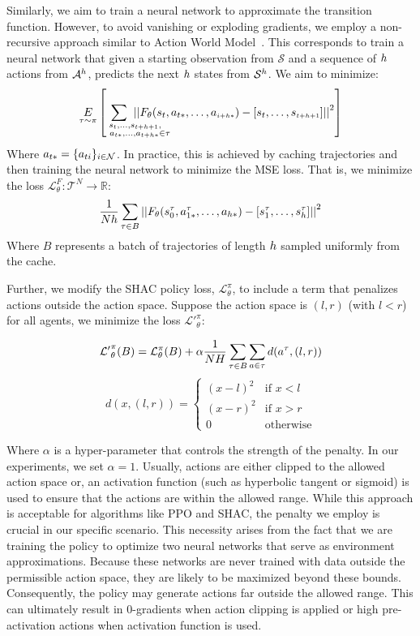 Similarly, we aim to train a neural network to approximate the transition function. However, to avoid vanishing or exploding gradients, we employ a non-recursive approach similar to Action World Model~\cite{Ma24}. This corresponds to train a neural network that given a starting observation from $\mathcal{S}$ and a sequence of $h$ actions from $\mathcal{A}^h$, predicts the next $h$ states from $\mathcal{S}^h$. We aim to minimize:
\begin{align*}
    \underset{\tau\sim\pi}{E}\left[\hspace{-1.2cm}\sum_{\scriptscriptstyle \hspace{1cm}\substack{s_t,\dots,s_{t+h+1},\\\hspace{.3cm}a_{t*},\dots,a_{t+h*}\in\tau}}\hspace{-1.2cm} \left\vert\left\vert \transition_{\theta}(s_t, a_{t*},\dots,a_{\scriptscriptstyle i+h*}) - [s_t,\dots,s_{\scriptscriptstyle t+h+1}] \right\vert\right\vert^2\right] 
\end{align*}
Where $a_{t*}=\{a_{ti}\}_{i\in\mathcal{N}}$. In practice, this is achieved by caching trajectories and then training the neural network to minimize the MSE loss. That is, we minimize the loss $\mathcal{L}_\theta^{F}:\mathcal{T}^N\rightarrow\mathbb{R}$:
$$ \frac{1}{Nh}\sum_{\tau \in B}\left|\left| F_{\theta}(s_0^\tau, a_{1*}^\tau, \dots, a_{h*}) - \left[ s^\tau_1, \dots, s^\tau_h \right] \right|\right|^2 $$
Where $B$ represents a batch of trajectories of length $h$ sampled uniformly from the cache.

Further, we modify the SHAC policy loss, $\mathcal{L}_\theta^{\pi}$, to include a term that penalizes actions outside the action space. Suppose the action space is $(l,r)$ (with $l<r$) for all agents, we minimize the loss $\mathcal{L'}_\theta^\pi:$

$$\mathcal{L'}_\theta^\pi(B) = \mathcal{L}_\theta^\pi(B) + \alpha \frac{1}{NH}\sum_{\tau\in B}\sum_{a\in\tau} d(a^\tau,(l,r))$$
$$d(x,(l,r)) = \begin{cases}(x-l)^2 & \text{if } x < l \\ (x-r)^2 & \text{if } x > r \\ 0 & \text{otherwise} \end{cases}$$

    Where $\alpha$ is a hyper-parameter that controls the strength of the penalty. In our experiments, we set $\alpha=1$. Usually, actions are either clipped to the allowed action space or, an activation function (such as hyperbolic tangent or sigmoid) is used to ensure that the actions are within the allowed range. While this approach is acceptable for algorithms like PPO and SHAC, the penalty we employ is crucial in our specific scenario. This necessity arises from the fact that we are training the policy to optimize two neural networks that serve as environment approximations. Because these networks are never trained with data outside the permissible action space, they are likely to be maximized beyond these bounds. Consequently, the policy may generate actions far outside the allowed range. This can ultimately result in 0-gradients when action clipping is applied or high pre-activation actions when activation function is used. 

